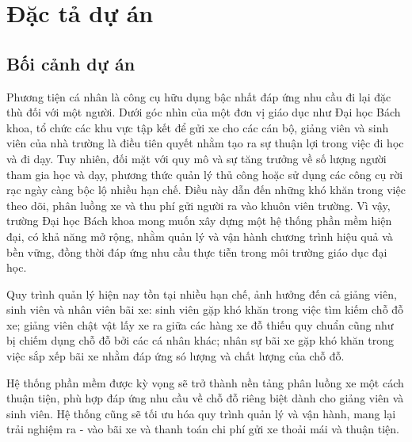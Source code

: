 \section{Đặc tả dự án}

\subsection{Bối cảnh dự án}

Phương tiện cá nhân là công cụ hữu dụng bậc nhất đáp ứng nhu cầu đi lại đặc thù đối với một người. Dưới góc nhìn của một đơn vị giáo dục như Đại học Bách khoa, tổ chức các khu vực tập kết để gửi xe cho các cán bộ, giảng viên và sinh viên của nhà trường là điều tiên quyết nhằm tạo ra sự thuận lợi trong việc đi học và đi dạy. Tuy nhiên, đối mặt với quy mô và sự tăng trưởng về số lượng người tham gia học và dạy, phương thức quản lý thủ công hoặc sử dụng các công cụ rời rạc ngày càng bộc lộ nhiều hạn chế. Điều này dẫn đến những khó khăn trong việc theo dõi, phân luồng xe và thu phí gửi người ra vào khuôn viên trường. Vì vậy, trường Đại học Bách khoa mong muốn xây dựng một hệ thống phần mềm hiện đại, có khả năng mở rộng, nhằm quản lý và vận hành chương trình hiệu quả và bền vững, đồng thời đáp ứng nhu cầu thực tiễn trong môi trường giáo dục đại học.

Quy trình quản lý hiện nay tồn tại nhiều hạn chế, ảnh hưởng đến cả giảng viên, sinh viên và nhân viên bãi xe: sinh viên gặp khó khăn trong việc tìm kiếm chỗ đỗ xe; giảng viên chật vật lấy xe ra giữa các hàng xe đỗ thiếu quy chuẩn cũng như bị chiếm dụng chỗ đỗ bởi các cá nhân khác; nhân sự bãi xe gặp khó khăn trong việc sắp xếp bãi xe nhằm đáp ứng só lượng và chất lượng của chỗ đỗ.

Hệ thống phần mềm được kỳ vọng sẽ trở thành nền tảng phân luồng xe một cách thuận tiện, phù hợp đáp ứng nhu cầu về chỗ đỗ riêng biệt dành cho giảng viên và sinh viên. Hệ thống cũng sẽ tối ưu hóa quy trình quản lý và vận hành, mang lại trải nghiệm ra - vào bãi xe và thanh toán chi phí gửi xe thoải mái và thuận tiện.